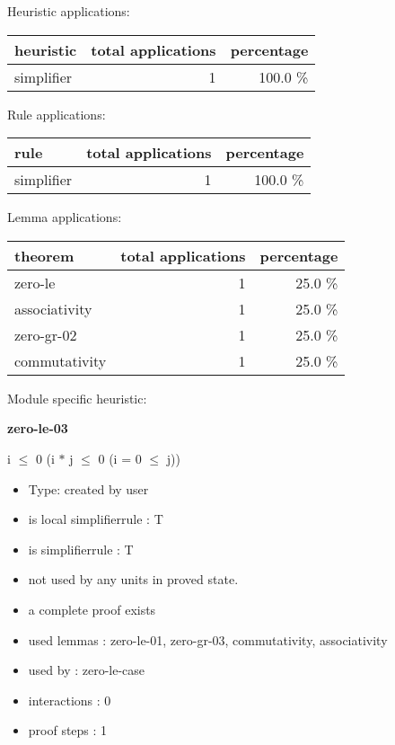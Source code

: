 \documentclass[a4paper]{article}
\begin{document}
\medskip


Heuristic applications:

\begin{supertabular}{l|r|r}
heuristic	& total applications & percentage \\ \hline
simplifier & 1 & 100.0 \% \\

\end{supertabular}

Rule applications:

\begin{supertabular}{l|r|r}
rule	        & total applications & percentage \\ \hline
simplifier & 1 & 100.0 \% \\

\end{supertabular}

Lemma applications:

\begin{supertabular}{l|r|r}
theorem	        & total applications & percentage \\ \hline
zero-le & 1 & 25.0 \% \\
associativity & 1 & 25.0 \% \\
zero-gr-02 & 1 & 25.0 \% \\
commutativity & 1 & 25.0 \% \\

\end{supertabular}

Module specific heuristic:

\pagebreak

{\LARGE\bf zero-le-03}\label{lemma-zero-le-03}

\medskip

 \Fol i $\le$ 0 \Imp (i $*$ j $\le$ 0 \Equiv \Not \Not (i = 0  $\le$ j))

\begin{itemize}

\item Type: created by user

\item is local simplifierrule : T
\item is simplifierrule : T
\item not used by any units in proved state.
\item       a complete proof exists
\item       used lemmas  : zero-le-01, zero-gr-03, commutativity, associativity
\item       used by      : zero-le-case
\item       interactions : 0
\item       proof steps  : 1
\end{itemize}
\end{document}
